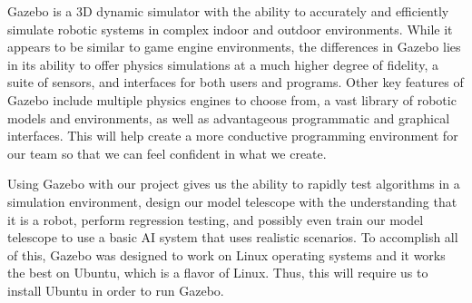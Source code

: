 \documentclass[12pt]{report}
\begin{document}
Gazebo is a 3D dynamic simulator with the ability to accurately and efficiently simulate robotic systems in complex indoor and outdoor environments. While it appears to be similar to game engine environments, the differences in Gazebo lies in its ability to offer physics simulations at a much higher degree of fidelity, a suite of sensors, and interfaces for both users and programs.\cite{GazeboDescription} Other key features of Gazebo include multiple physics engines to choose from, a vast library of robotic models and environments, as well as advantageous programmatic and graphical interfaces. This will help create a more conductive programming environment for our team so that we can feel confident in what we create.

\newpage

Using Gazebo with our project gives us the ability to rapidly test algorithms in a simulation environment, design our model telescope with the understanding that it is a robot, perform regression testing, and possibly even train our model telescope to use a basic AI system that uses realistic scenarios. To accomplish all of this, Gazebo was designed to work on Linux operating systems and it works the best on Ubuntu, which is a flavor of Linux. Thus, this will require us to install Ubuntu in order to run Gazebo.
\end{document}
